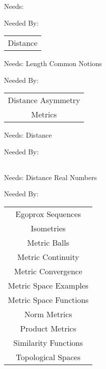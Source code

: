 \newpage
\label{length_common_notions}


\clearpage
Needs: 

Needed By: \begin{tabular}{c} Distance \\ 
\end{tabular}
\clearpage{}

\newpage
\label{distance}


\clearpage
Needs:  Length Common Notions 

Needed By: \begin{tabular}{c} Distance Asymmetry \\  Metrics \\ 
\end{tabular}
\clearpage{}

\newpage
\label{distance_asymmetry}


\clearpage
Needs:  Distance 

Needed By: \begin{tabular}{c}
\end{tabular}
\clearpage{}

\newpage
\label{metrics}


\clearpage
Needs:  Distance  Real Numbers 

Needed By: \begin{tabular}{c} Egoprox Sequences \\  Isometries \\  Metric Balls \\  Metric Continuity \\  Metric Convergence \\  Metric Space Examples \\  Metric Space Functions \\  Norm Metrics \\  Product Metrics \\  Similarity Functions \\  Topological Spaces \\ 
\end{tabular}
\clearpage{}

